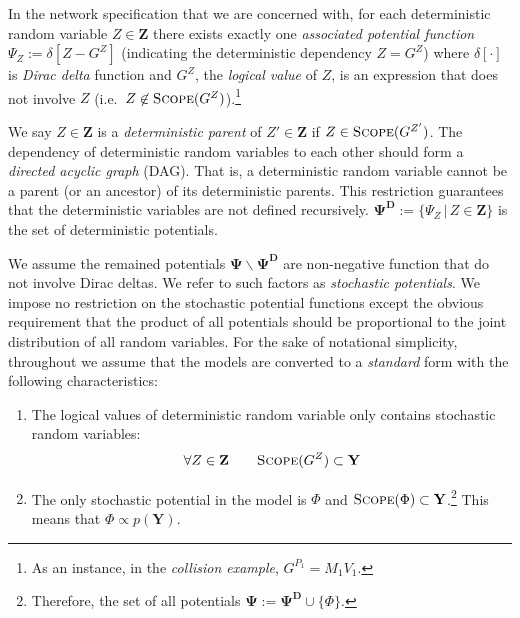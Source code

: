 \documentclass{article}
\newcommand{\bvec}[1]{\textbf{#1}}
\newcommand{\pr}{p}
\begin{document}
In the network specification that we are concerned with, 
for each deterministic random variable $Z \in \bvec{Z}$ there exists exactly one \emph{associated potential function} 
$\Psi_Z := \delta[Z - G^Z]$ (indicating the deterministic dependency $Z = G^Z$)
where $\delta[\cdot]$ is \emph{Dirac delta} function and $G^Z$, the \emph{logical value} of $Z$,  is an expression that does not involve $Z$ (i.e.\ $Z \not\in \textsc{Scope}(G^{Z})$).\footnote{
As an instance, in the \emph{collision example}, $G^{P_1} = M_1 V_1$.
}


We say $Z\in \bvec{Z}$ is a \emph{deterministic parent} of $Z' \in \bvec{Z}$ if 
$Z \in \textsc{Scope}(G^{Z'})$. 
The dependency of deterministic random variables to each other should form a \emph{directed acyclic graph} (DAG). That is, a deterministic random variable cannot be a parent (or an ancestor) of its deterministic parents. This restriction guarantees that the deterministic variables are not defined recursively.
$\boldsymbol{\Psi^D} :=\{\Psi_Z \,|\, Z \in \bvec{Z}\}$ is the set of deterministic potentials.

We assume the remained potentials 
$\boldsymbol{\Psi} \backslash \boldsymbol{\Psi^D}$ 
are non-negative function that do not involve Dirac deltas. We refer to such factors as \emph{stochastic potentials}.
We impose no restriction on the stochastic potential functions except the obvious requirement that the product of all potentials should be proportional to the joint distribution of all random variables. 
For the sake of notational simplicity, throughout we assume that the models are converted to a \emph{standard} form with the following characteristics:
\begin{enumerate}
\item The logical values of deterministic random variable only contains stochastic random variables:
\begin{equation}
\label{e:as1}
\forall Z \in \bvec{Z} \qquad \textsc{Scope}(G^Z) \subset \bvec{Y}
\end{equation} 
\item The only stochastic potential in the model is $\Phi$ and $\textsc{Scope}(\Phi) \subset \bvec{Y}$.\footnote{
Therefore, the set of all potentials $\boldsymbol{\Psi} := \boldsymbol{\Psi^D} \cup \{\Phi\}$. %
} This means that $\Phi \propto \pr(\bvec{Y})$.
\end{enumerate}
\end{document}

